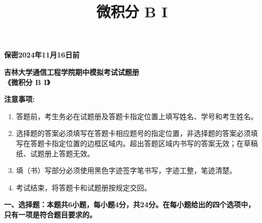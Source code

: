 \documentclass[a4paper,12pt]{article}
\title{\CJKfamily{hei} 微积分 B I}
\date{}
\begin{document}
\noindent
\textbf{保密2024年11月16日前}\\

\begin{center}
    {\LARGE \textbf{\spaceskip=4pt 吉林大学通信工程学院期中模拟考试试题册}}\\[1.5em]
    {\LARGE \textbf{\spaceskip=4pt 《微积分 B I》}}
\end{center}

\noindent
\textbf{注意事项:}
\begin{enumerate}[itemsep=0.2pt]
    \item 答题前，考生务必在试题册及答题卡指定位置上填写姓名、学号和考生姓名。
    \item 选择题的答案必须填写在答题卡相应题号的指定位置，非选择题的答案必须填写在答题卡指定位置的边框区域内。超出答题区域内书写的答案无效；在草稿纸、试题册上答题无效。
    \item 填（书）写部分必须使用黑色字迹签字笔书写，字迹工整，笔迹清楚。
    \item 考试结束，将答题卡和试题册按规定交回。
\end{enumerate}

\noindent
\textbf{一、选择题：本题共6小题，每小题4分，共24分。在每小题给出的四个选项中，只有一项是符合题目要求的。}
\end{document}
